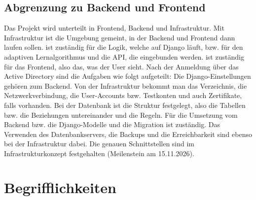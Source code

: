 \subsection{Abgrenzung zu Backend und Frontend}
 
Das Projekt wird unterteilt in Frontend, Backend und Infrastruktur. Mit Infrastruktur ist die Umgebung gemeint, in der Backend und Frontend dann laufen sollen. \Luca ist zuständig für die Logik, welche auf Django läuft, bzw. für den adaptiven Lernalgorithmus und die API, die eingebunden werden. \Jakob ist zuständig für das Frontend, also das, was der User sieht. Nach der Anmeldung über das Active Directory sind die Aufgaben wie folgt aufgeteilt: Die Django-Einstellungen gehören zum Backend. Von der Infrastruktur bekommt man das Verzeichnis, die Netzwerkverbindung, die User-Accounts bzw. Testkonten und auch Zertifikate, falls vorhanden. Bei der Datenbank ist die Struktur festgelegt, also die Tabellen bzw. die Beziehungen untereinander und die Regeln. Für die Umsetzung vom Backend bzw. die Django-Modelle und die Migration ist \Luca zuständig. Das Verwenden des Datenbankservers, die Backups und die Erreichbarkeit sind ebenso bei der Infrastruktur dabei. Die genauen Schnittstellen sind im Infrastrukturkonzept festgehalten (Meilenstein am 15.11.2026).
 
 
\section{Begrifflichkeiten}
 
